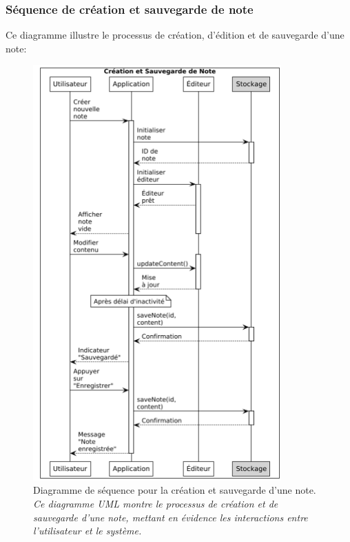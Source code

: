     \subsubsection{Séquence de création et sauvegarde de note}
    
    Ce diagramme illustre le processus de création, d'édition et de sauvegarde d'une note:
    
        \begin{figure}[htbp]
        \centering
        \includegraphics[width=0.85\textwidth]{assets/docs/voicenotion_sequence_save.png}
        \caption{Diagramme de séquence pour la création et sauvegarde d'une note. \newline\textit{Ce diagramme UML montre le processus de création et de sauvegarde d'une note, mettant en évidence les interactions entre l'utilisateur et le système.}}
        \label{fig:sequence_save_note}
    \end{figure}
    
